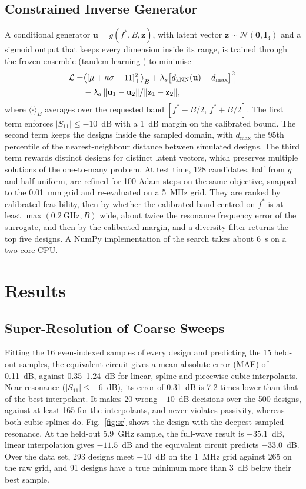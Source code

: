 \documentclass[conference,a4paper]{IEEEtran}
\begin{document}
\subsection{Constrained Inverse Generator}
A conditional generator $\mathbf{u}=g(f^*,B,\mathbf{z})$, with latent vector $\mathbf{z}\sim\mathcal{N}(\mathbf{0},\mathbf{I}_4)$ and a sigmoid output that keeps every dimension inside its range, is trained through the frozen ensemble (tandem learning \cite{liu2018tandem}) to minimise
\begin{align}
\mathcal{L}=&\big\langle[\mu+\kappa\sigma+11]_+^2\big\rangle_{B}+\lambda_s\big[d_{\rm kNN}(\mathbf{u})-d_{\max}\big]_+^2\nonumber\\
&-\lambda_d\,\|\mathbf{u}_1-\mathbf{u}_2\|/\|\mathbf{z}_1-\mathbf{z}_2\|,
\end{align}
where $\langle\cdot\rangle_B$ averages over the requested band $[f^*-B/2,\,f^*+B/2]$. The first term enforces $|S_{11}|\le-10$~dB with a 1~dB margin on the calibrated bound. The second term keeps the designs inside the sampled domain, with $d_{\max}$ the 95th percentile of the nearest-neighbour distance between simulated designs. The third term rewards distinct designs for distinct latent vectors, which preserves multiple solutions of the one-to-many problem. At test time, 128 candidates, half from $g$ and half uniform, are refined for 100 Adam steps on the same objective, snapped to the 0.01~mm grid and re-evaluated on a 5~MHz grid. They are ranked by calibrated feasibility, then by whether the calibrated band centred on $f^*$ is at least $\max(0.2~\mathrm{GHz},B)$ wide, about twice the resonance frequency error of the surrogate, and then by the calibrated margin, and a diversity filter returns the top five designs. A NumPy implementation of the search takes about 6~s on a two-core CPU.

\section{Results}
\subsection{Super-Resolution of Coarse Sweeps}
Fitting the 16 even-indexed samples of every design and predicting the 15 held-out samples, the equivalent circuit gives a mean absolute error (MAE) of 0.11~dB, against 0.35--1.24~dB for linear, spline and piecewise cubic interpolants. Near resonance ($|S_{11}|\le-6$~dB), its error of 0.31~dB is 7.2 times lower than that of the best interpolant. It makes 20 wrong $-10$~dB decisions over the 500 designs, against at least 165 for the interpolants, and never violates passivity, whereas both cubic splines do. Fig.~\ref{fig:sr} shows the design with the deepest sampled resonance. At the held-out 5.9~GHz sample, the full-wave result is $-35.1$~dB, linear interpolation gives $-11.5$~dB and the equivalent circuit predicts $-33.0$~dB. Over the data set, 293 designs meet $-10$~dB on the 1~MHz grid against 265 on the raw grid, and 91 designs have a true minimum more than 3~dB below their best sample.
\end{document}
